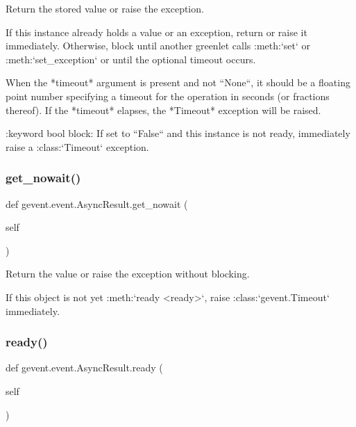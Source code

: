 \begin{DoxyVerb}Return the stored value or raise the exception.

If this instance already holds a value or an exception, return  or raise it immediately.
Otherwise, block until another greenlet calls :meth:`set` or :meth:`set_exception` or
until the optional timeout occurs.

When the *timeout* argument is present and not ``None``, it should be a
floating point number specifying a timeout for the operation in seconds
(or fractions thereof). If the *timeout* elapses, the *Timeout* exception will
be raised.

:keyword bool block: If set to ``False`` and this instance is not ready,
    immediately raise a :class:`Timeout` exception.
\end{DoxyVerb}
 \mbox{\label{classgevent_1_1event_1_1_async_result_a8cc986866f45ba3ff3ad3658bf7280bf}} 
\subsubsection{\texorpdfstring{get\+\_\+nowait()}{get\_nowait()}}
{\footnotesize\ttfamily def gevent.\+event.\+Async\+Result.\+get\+\_\+nowait (\begin{DoxyParamCaption}\item[{}]{self }\end{DoxyParamCaption})}

\begin{DoxyVerb}Return the value or raise the exception without blocking.

If this object is not yet :meth:`ready <ready>`, raise
:class:`gevent.Timeout` immediately.
\end{DoxyVerb}
 \mbox{\label{classgevent_1_1event_1_1_async_result_a4b625390f5320b6921bc0c2f0afad192}} 
\subsubsection{\texorpdfstring{ready()}{ready()}}
{\footnotesize\ttfamily def gevent.\+event.\+Async\+Result.\+ready (\begin{DoxyParamCaption}\item[{}]{self }\end{DoxyParamCaption})}

